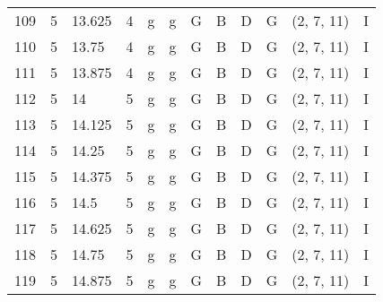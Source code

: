 \begin{tabular}{llllllllllll}
109 & 5       & 13.625 & 4               & g          & g              & G      & B       & D      & G         & (2, 7, 11)       & I              \\
110 & 5       & 13.75  & 4               & g          & g              & G      & B       & D      & G         & (2, 7, 11)       & I              \\
111 & 5       & 13.875 & 4               & g          & g              & G      & B       & D      & G         & (2, 7, 11)       & I              \\
112 & 5       & 14     & 5               & g          & g              & G      & B       & D      & G         & (2, 7, 11)       & I              \\
113 & 5       & 14.125 & 5               & g          & g              & G      & B       & D      & G         & (2, 7, 11)       & I              \\
114 & 5       & 14.25  & 5               & g          & g              & G      & B       & D      & G         & (2, 7, 11)       & I              \\
115 & 5       & 14.375 & 5               & g          & g              & G      & B       & D      & G         & (2, 7, 11)       & I              \\
116 & 5       & 14.5   & 5               & g          & g              & G      & B       & D      & G         & (2, 7, 11)       & I              \\
117 & 5       & 14.625 & 5               & g          & g              & G      & B       & D      & G         & (2, 7, 11)       & I              \\
118 & 5       & 14.75  & 5               & g          & g              & G      & B       & D      & G         & (2, 7, 11)       & I              \\
119 & 5       & 14.875 & 5               & g          & g              & G      & B       & D      & G         & (2, 7, 11)       & I             
\end{tabular}
